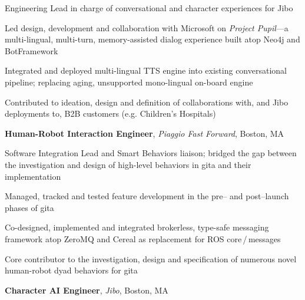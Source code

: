 \documentclass[10pt, letter]{article}
\newcommand{\years}[1]{\marginnote{\footnotesize #1}}
\newenvironment{desc*}{
  \begin{description}
    \setlength{\itemsep}{0.2pt}
    \setlength{\parskip}{-1pt}
    \setlength{\parsep}{0pt}
  }{
  \end{description}
}
\begin{document}
Engineering Lead in charge of conversational and character experiences for Jibo
\begin{itemize}[leftmargin=*, rightmargin=1.5cm]
  {\light
\item Led design, development and collaboration with Microsoft on \textit{Project Pupil}---a
  multi-lingual, multi-turn, memory-assisted dialog experience built atop Neo4j and BotFramework
\item Integrated and deployed multi-lingual TTS engine into existing
  conversational pipeline; replacing aging, unsupported mono-lingual on-board engine
\item Contributed to ideation, design and definition of collaborations with, and Jibo deployments
  to, B2B customers (e.g. Children's Hospitals)
  }
\end{itemize}
\bigskip
\years{2018 -- 2020} 
\textbf{Human-Robot Interaction Engineer},
\textit{Piaggio Fast Forward}, Boston, MA\bigskip

Software Integration Lead and Smart Behaviors liaison; bridged the gap between the investigation and
design of high-level behaviors in gita and their implementation
\begin{itemize}[leftmargin=*, rightmargin=1.5cm]
  {\light
\item Managed, tracked and tested feature development in the pre-- and post--launch phases of gita
\item Co-designed, implemented and integrated brokerless, type-safe messaging framework
  atop ZeroMQ and Cereal as replacement for ROS core\,/\,messages
\item Core contributor to the investigation, design and specification of numerous novel
  human-robot dyad behaviors for gita
  }
\end{itemize}
\bigskip
\years{2016 -- 2018} 
\textbf{Character AI Engineer},
\textit{Jibo}, Boston, MA\bigskip
\end{document}
